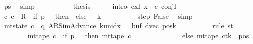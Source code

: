 \begin{isabellebody}
\ ps\ \isamarkupfalse%
\ simp\isanewline
\ \ \ \ \isamarkupfalse%
\isanewline
\ \ \ \ \isamarkupfalse%
\ {\isacharquery}{\kern0pt}thesis\isanewline
\ \ \ \ \isamarkupfalse%
\ {\isacharparenleft}{\kern0pt}intro\ exI{\isacharbrackleft}{\kern0pt}\ x\ {\isacharequal}{\kern0pt}\ c{\isacharprime}{\kern0pt}{\isacharprime}{\kern0pt}{\isacharbrackright}{\kern0pt}\ conjI{\isacharparenright}{\kern0pt}\isanewline
\ \ \ \ \ \ \isamarkupfalse%
\ {\isachardoublequoteopen}{\isacharparenleft}{\kern0pt}c{\isacharprime}{\kern0pt}{\isacharcomma}{\kern0pt}\ c{\isacharprime}{\kern0pt}{\isacharprime}{\kern0pt}{\isacharparenright}{\kern0pt}\ {\isasymin}\ {\isacharquery}{\kern0pt}R\ {\isacharcircum}{\kern0pt}{\isacharcircum}{\kern0pt}\ {\isacharparenleft}{\kern0pt}if\ p\ {\isacharequal}{\kern0pt}\ {}\ then\ {}\ else\ {}\ {\isacharasterisk}{\kern0pt}\ {\isacharquery}{\kern0pt}k{\isacharparenright}{\kern0pt}{\isachardoublequoteclose}\isanewline
\ \ \ \ \ \ \ \ \isamarkupfalse%
\ step\ False\ \isamarkupfalse%
\ simp\isanewline
\ \ \ \ \ \ \isamarkupfalse%
\ {\isachardoublequoteopen}mt{\isacharunderscore}{\kern0pt}state\ c{\isacharprime}{\kern0pt}{\isacharprime}{\kern0pt}\ {\isacharequal}{\kern0pt}\ {\isacharparenleft}{\kern0pt}q{\isacharcomma}{\kern0pt}\ AR{\isacharunderscore}{\kern0pt}SimAdvance{\isacharcomma}{\kern0pt}\ k{\isacharunderscore}{\kern0pt}unidx\ {}{\isacharcomma}{\kern0pt}\ {}{\isacharcomma}{\kern0pt}\ buf{\isacharcomma}{\kern0pt}\ dvec{\isacharcomma}{\kern0pt}\ posk{\isacharparenright}{\kern0pt}{\isachardoublequoteclose}\isanewline
\ \ \ \ \ \ \ \ \isamarkupfalse%
\ {\isacharparenleft}{\kern0pt}rule\ st{\isacharparenright}{\kern0pt}\isanewline
\ \ \ \ \ \ \isamarkupfalse%
\ {\isachardoublequoteopen}mt{\isacharunderscore}{\kern0pt}tape\ c{\isacharprime}{\kern0pt}{\isacharprime}{\kern0pt}\ {\isacharequal}{\kern0pt}\ {\isacharparenleft}{\kern0pt}if\ p\ {\isacharequal}{\kern0pt}\ {}\ then\ mt{\isacharunderscore}{\kern0pt}tape\ c{\isacharprime}{\kern0pt}\isanewline
\ \ \ \ \ \ \ \ \ \ \ \ \ \ else\ {\isacharparenleft}{\kern0pt}mt{\isacharunderscore}{\kern0pt}tape\ c{\isacharprime}{\kern0pt}{\isacharparenright}{\kern0pt}{\isacharparenleft}{\kern0pt}tk\ {\isacharcolon}{\kern0pt}{\isacharequal}{\kern0pt}\ {\isacharparenleft}{\kern0pt}{\isasymlambda}pos{\isachardot}{\kern0pt}\isanewline

\end{isabellebody}
